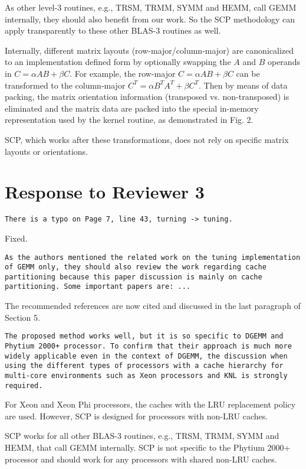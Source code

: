 \documentclass[]{article}
\begin{document}
As other level-3 routines, e.g., TRSM, TRMM, SYMM and HEMM,
call GEMM internally, they should also benefit from our work.
So the SCP methodology can apply transparently to 
these other BLAS-3 routines as well.

Internally, different matrix layouts (row-major/column-major)
are canonicalized to an implementation defined form
by optionally swapping the $A$ and $B$ operands in $C=\alpha A B+\beta C$.
For example, the row-major $C=\alpha A B+\beta C$ can be transformed to
the column-major $C^T=\alpha B^T A^T + \beta C^T$.
Then by means of data packing, the
matrix orientation information (transposed vs. non-transposed)
is eliminated and the matrix data are
packed into the special
in-memory representation used by the kernel routine, as demonstrated in Fig. 2.


SCP, which works after these transformations, 
does not rely on
specific matrix layouts or orientations.

\section{Response to Reviewer 3}

\begin{verbatim}
There is a typo on Page 7, line 43, turning -> tuning.
\end{verbatim}

Fixed.

\begin{verbatim}
As the authors mentioned the related work on the tuning implementation
of GEMM only, they should also review the work regarding cache 
partitioning because this paper discussion is mainly on cache
partitioning. Some important papers are: ...
\end{verbatim}

The recommended references are now cited and
discussed in the last paragraph of Section 5.

\begin{verbatim}
The proposed method works well, but it is so specific to DGEMM and
Phytium 2000+ processor. To confirm that their approach is much more
widely applicable even in the context of DGEMM, the discussion when
using the different types of processors with a cache hierarchy for
multi-core environments such as Xeon processors and KNL is strongly
required.
\end{verbatim}

For Xeon and Xeon Phi processors, the caches with
the LRU replacement policy are used.
However,
SCP is designed for processors with non-LRU caches.

SCP works for all other BLAS-3 routines, e.g., TRSM, TRMM, SYMM and HEMM, that call GEMM internally.
SCP is not specific to the Phytium 2000+ processor and
should work for any processors with shared non-LRU caches.
\end{document}
